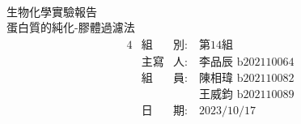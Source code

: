 


\pagestyle{empty}

\begin{center}
~\\
\vspace{2.7cm}
{\fontsize{36}{120}\selectfont 生物化學實驗報告}\\
\vspace{2.2cm}
{\fontsize{36}{80}\selectfont 蛋白質的純化-膠體過濾法}
\vspace{2cm}
{\fontsize{18}{20}\selectfont 
  \begin{alignat*}{4}
    &\text{組}&\text{別}:\ &\text{第14組}\\
    &\text{主寫}&\text{人}:\ &\text{李品辰 b202110064}\\
    &\text{組}&\text{員}:\ &\text{陳相瑋 b202110082}\\
         &&&\text{王威鈞 b202110089}\\
    &\text{日}&\text{期}:\ &\text{2023/10/17}\\
  \end{alignat*}    
}


\end{center}
\newpage

